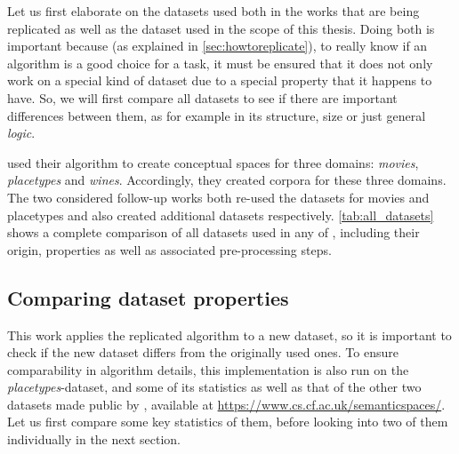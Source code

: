 \label{sec:datasets}



Let us first elaborate on the datasets used both in the works that are being replicated as well as the dataset used in the scope of this thesis. Doing both is important because (as explained in \autoref{sec:howtoreplicate}), to really know if an algorithm is a good choice for a task, it must be ensured that it does not only work on a special kind of dataset due to a special property that it happens to have. So, we will first compare all datasets to see if there are important differences between them, as for example in its structure, size or just general \emph{logic}.

\textcite{Derrac2015} used their algorithm to create conceptual spaces for three domains: \textit{movies}, \textit{placetypes} and \textit{wines}. Accordingly, they created corpora for these three domains. The two considered follow-up works both re-used the datasets for movies and placetypes and also created additional datasets respectively. \autoref{tab:all_datasets} shows a complete comparison of all datasets used in any of \mainalgos, including their origin, properties as well as associated pre-processing steps.


\subsection*{Comparing dataset properties}

This work applies the replicated algorithm to a new dataset, so it is important to check if the new dataset differs from the originally used ones. To ensure comparability in algorithm details, this implementation is also run on the \emph{placetypes}-dataset, and some of its statistics as well as that of the other two datasets made public by \cite{Derrac2015}, available at \url{https://www.cs.cf.ac.uk/semanticspaces/}. Let us first compare some key statistics of them, before looking into two of them individually in the next section.

